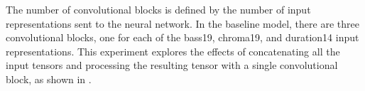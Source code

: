 
The number of convolutional blocks is defined by the number
of input representations sent to the neural network. In the
baseline model, there are three convolutional blocks, one
for each of the \gls{bass19}, \gls{chroma19}, and
\gls{duration14} input representations. This experiment
explores the effects of concatenating all the input tensors
and processing the resulting tensor with a single
convolutional block, as shown in .

